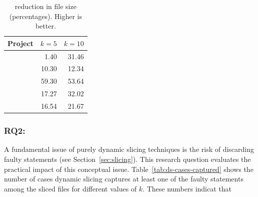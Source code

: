 \documentclass{article}
\begin{document}

\begin{table}[H]
  \small
	\centering
	\setlength{\tabcolsep}{4pt}
	\begin{tabular}{lrr}
		\toprule
		Project             &  \multicolumn{1}{c}{$k=5$} & \multicolumn{1}{c}{$k=10$} \\ %
		\midrule

        \lang{}            & 1.40 & 31.46\\
        \cmath{}           & 10.30 & 12.34\\
		\chart{}			& 59.30 & 53.64 \\
        \jtime{}            & 17.27 & 32.02\\
        \mockito{}          & 16.54 & 21.67\\

		\bottomrule
	\end{tabular}
	\caption {\ds{} reduction in file size (percentages). Higher is better.}
	\label{tab:red}
\end{table}
\normalsize

\subsubsection{RQ2: \textit{\rqtwo}}
\label{rq:2}






A fundamental issue of purely dynamic slicing techniques is the risk
of discarding faulty statements (see Section~\ref{sec:slicing}). This
research question evaluates the practical impact of this conceptual
issue. Table~\ref{tab:ds-cases-captured} shows the number of cases
dynamic slicing captures at least one of the faulty statements among
the sliced files for different values of $k$. These numbers indicat
that 
\end{document}
